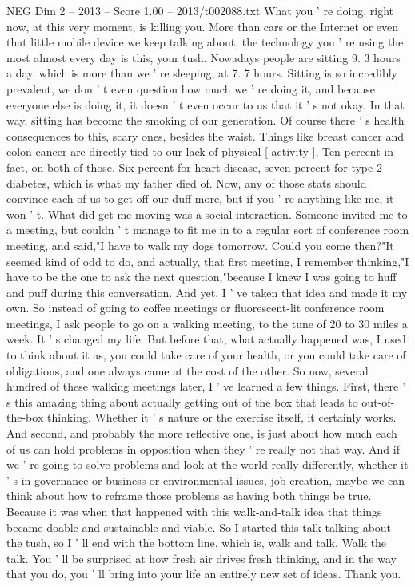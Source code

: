 \begin{textsample}{NEG Dim 2 – 2013 – Score 1.00 – 2013/t002088.txt}  \label{ex:f2_neg_031}
What you ' re doing, right now, at this very moment, is killing you.
More than cars or the Internet or even that little mobile device we keep talking about, the technology you ' re using the most almost every day is this, your tush.
Nowadays people are sitting 9. 3 hours a day, which is more than we ' re sleeping, at 7. 7 hours.
Sitting is so incredibly prevalent, we don ' t even question how much we ' re doing it, and because everyone else is doing it, it doesn ' t even occur to us that it ' s not okay.
In that way, sitting has become the smoking of our generation.
Of course there ' s health consequences to this, scary ones, besides the waist.
Things like breast cancer and colon cancer are directly tied to our lack of physical [ activity ], Ten percent in fact, on both of those.
Six percent for heart disease, seven percent for type 2 diabetes, which is what my father died of.
Now, any of those stats should convince each of us to get off our duff more, but if you ' re anything like me, it won ' t.
What did get me moving was a social interaction.
Someone invited me to a meeting, but couldn ' t manage to fit me in to a regular sort of conference room meeting, and said,"I have to walk my dogs tomorrow.
Could you come then?"It seemed kind of odd to do, and actually, that first meeting, I remember thinking,"I have to be the one to ask the next question,"because I knew I was going to huff and puff during this conversation.
And yet, I ' ve taken that idea and made it my own.
So instead of going to coffee meetings or fluorescent-lit conference room meetings, I ask people to go on a walking meeting, to the tune of 20 to 30 miles a week.
It ' s changed my life.
But before that, what actually happened was, I used to think about it as, you could take care of your health, or you could take care of obligations, and one always came at the cost of the other.
So now, several hundred of these walking meetings later, I ' ve learned a few things.
First, there ' s this amazing thing about actually getting out of the box that leads to out-of-the-box thinking.
Whether it ' s nature or the exercise itself, it certainly works.
And second, and probably the more reflective one, is just about how much each of us can hold problems in opposition when they ' re really not that way.
And if we ' re going to solve problems and look at the world really differently, whether it ' s in governance or business or environmental issues, job creation, maybe we can think about how to reframe those problems as having both things be true.
Because it was when that happened with this walk-and-talk idea that things became doable and sustainable and viable.
So I started this talk talking about the tush, so I ' ll end with the bottom line, which is, walk and talk.
Walk the talk.
You ' ll be surprised at how fresh air drives fresh thinking, and in the way that you do, you ' ll bring into your life an entirely new set of ideas.
Thank you.

\end{textsample}
